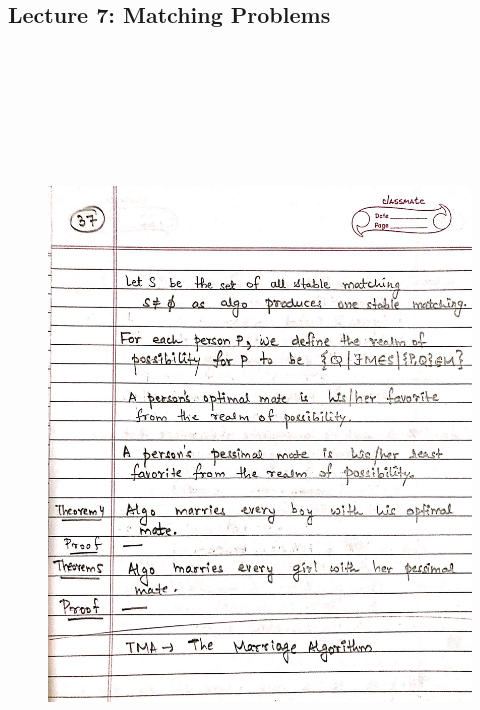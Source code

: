 \newpage
{\color{black} \subsection*{Lecture 7: Matching Problems}}
\begin{figure}[H]
    \centering
    \includegraphics[width=16cm, height=21cm]{"./MIT-6.042J/MIT-6042J-037"}
\end{figure}


